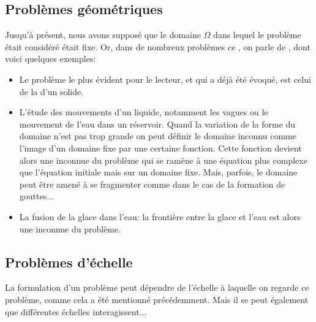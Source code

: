 \subsection{Problèmes géométriques}
Jusqu'à présent, nous avons supposé que le domaine $\Omega$ dans lequel le problème était considéré était fixe. Or, dans de nombreux problèmes ce , on parle de , dont voici quelques exemples:
\begin{itemize}
\item Le problème le plus évident pour le lecteur, et qui a déjà été évoqué, est celui de la  d'un solide.
\item L'étude des mouvements d'un liquide, notamment les vagues ou le mouvement de l'eau 	dans un réservoir.
	Quand la variation de la forme du domaine n'est pas trop grande on peut définir 	le domaine inconnu comme l'image d'un domaine fixe par une certaine fonction. Cette fonction devient alors une inconnue du problème qui se ramène à une équation plus complexe que l'équation initiale mais sur un domaine fixe. Mais, parfois, le domaine peut être amené à se fragmenter comme dans le cas de la formation de gouttes...
  \item La fusion de la glace dans l'eau: la frontière entre la glace et l'eau est alors une inconnue du problème.
\end{itemize}

\medskip
\subsection{Problèmes d'échelle}
La formulation d'un problème peut dépendre de l'échelle à laquelle on regarde ce problème, comme cela a été mentionné précédemment. Mais il se peut également que différentes échelles interagissent...

